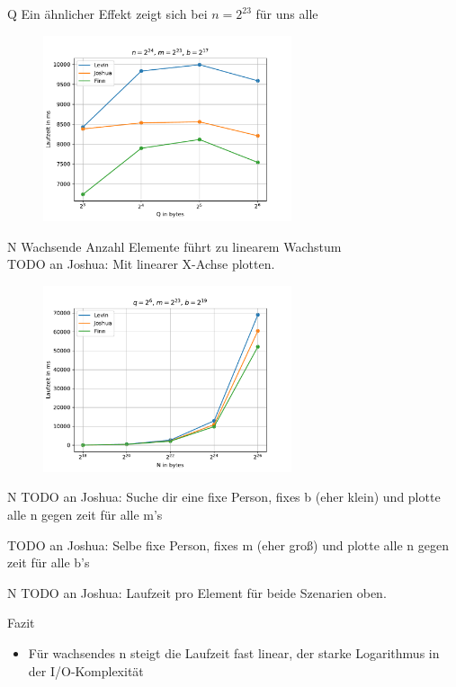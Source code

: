 \documentclass[ngerman,aspectratio=169,10pt]{beamer}
\begin{document}
\begin{frame}{Q}
Ein ähnlicher Effekt zeigt sich bei $n=2^{23}$ für uns alle
\begin{figure}[H]
    \centering
    \includegraphics[width=0.65\textwidth]{q__n_16777216_m_8388608_b_131072.pdf}
    \label{fig:f5}
\end{figure}
\end{frame}

\begin{frame}{N}
Wachsende Anzahl Elemente führt zu linearem Wachstum\\
TODO an Joshua: Mit linearer X-Achse plotten.
\begin{figure}[H]
    \centering
    \includegraphics[width=0.65\textwidth]{n__q_64_m_8388608_b_524288.pdf}
    \label{fig:f2}
\end{figure}
\end{frame}

\begin{frame}{N}
TODO an Joshua: Suche dir eine fixe Person, fixes b (eher klein) und plotte alle n gegen zeit für alle m's

TODO an Joshua: Selbe fixe Person, fixes m (eher groß) und plotte alle n gegen zeit für alle b's
\end{frame}

\begin{frame}{N}
TODO an Joshua: Laufzeit pro Element für beide Szenarien oben.
\end{frame}

\begin{frame}{Fazit}
\begin{itemize}
    \item Für wachsendes n steigt die Laufzeit fast linear, der starke Logarithmus in der I/O-Komplexität
\end{itemize}
\end{frame}
\end{document}
